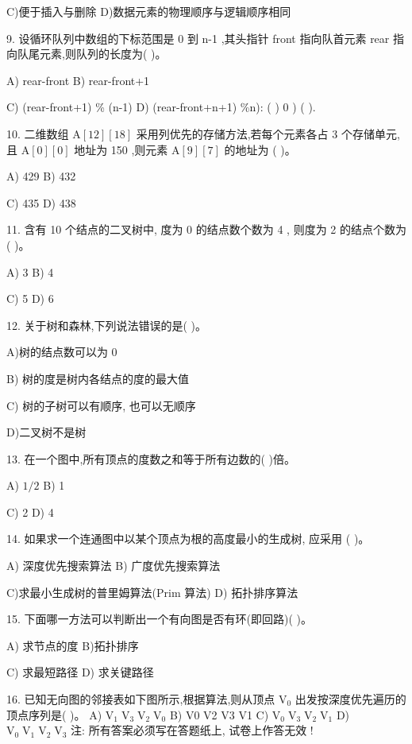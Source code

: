 C)便于插入与删除 D)数据元素的物理顺序与逻辑顺序相同

9. 设循环队列中数组的下标范围是 0 到 n-1 ,其头指针 front 指向队首元素 rear 指向队尾元素,则队列的长度为(   )。

A) rear-front B) rear-front+1

C) (rear-front+1) \% (n-1) D) (rear-front+n+1) \%n): (   ) 0 ) (   ).

10. 二维数组 \(\mathrm{A}\left\lbrack  {12}\right\rbrack  \left\lbrack  {18}\right\rbrack\) 采用列优先的存储方法,若每个元素各占 3 个存储单元, 且 \(\mathrm{A}\left\lbrack  0\right\rbrack  \left\lbrack  0\right\rbrack\) 地址为 150 ,则元素 \(\mathrm{A}\left\lbrack  9\right\rbrack  \left\lbrack  7\right\rbrack\) 的地址为 (   )。

A) 429 B) 432

C) 435 D) 438

11. 含有 10 个结点的二叉树中, 度为 0 的结点数个数为 4 , 则度为 2 的结点个数为(   )。

A) 3 B) 4

C) 5 D) 6

12. 关于树和森林,下列说法错误的是(   )。

A)树的结点数可以为 0

B) 树的度是树内各结点的度的最大值

C) 树的子树可以有顺序, 也可以无顺序

D)二叉树不是树

13. 在一个图中,所有顶点的度数之和等于所有边数的(   )倍。

A) \(1/2\) B) 1

C) 2 D) 4

14. 如果求一个连通图中以某个顶点为根的高度最小的生成树, 应采用 (   )。

A) 深度优先搜索算法 B) 广度优先搜索算法

C)求最小生成树的普里姆算法(Prim 算法) D) 拓扑排序算法

15. 下面哪一方法可以判断出一个有向图是否有环(即回路)(   )。

A) 求节点的度 B)拓扑排序

C) 求最短路径 D) 求关键路径

16. 已知无向图的邻接表如下图所示,根据算法,则从顶点 \({\mathrm{V}}_{0}\) 出发按深度优先遍历的顶点序列是(   )。 A) \({\mathrm{V}}_{1}{\mathrm{\;V}}_{3}{\mathrm{\;V}}_{2}{\mathrm{\;V}}_{0}\) B) V0 V2 V3 V1 C) \({\mathrm{V}}_{0}{\mathrm{\;V}}_{3}{\mathrm{\;V}}_{2}{\mathrm{\;V}}_{1}\) D) \({\mathrm{V}}_{0}{\mathrm{\;V}}_{1}{\mathrm{\;V}}_{2}{\mathrm{\;V}}_{3}\) 注: 所有答案必须写在答题纸上, 试卷上作答无效 !

